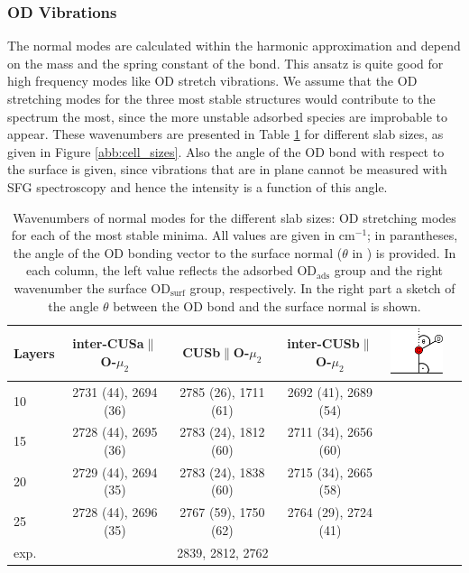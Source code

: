 \documentclass[11pt,DIV=13,BCOR=5mm,a4paper,headinclude]{scrbook}
\begin{document}
\subsubsection{OD Vibrations}
The normal modes are calculated within the harmonic approximation and depend on the mass and the spring constant of the bond.
This ansatz is quite good for high frequency modes like OD stretch vibrations.
We assume that the OD stretching modes for the three most stable structures would contribute to the spectrum the most, since the more unstable adsorbed species are improbable to appear.
These wavenumbers are presented in Table \ref{tab:freq_layers} for different slab sizes, as given in Figure \ref{abb:cell_sizes}.
Also the angle of the OD bond with respect to the surface is given, since vibrations that are in plane cannot be measured with SFG spectroscopy and hence the intensity is a function of this angle.
\begin{table}[th]
  \centering
 \caption{Wavenumbers of normal modes for the different slab sizes: OD stretching modes for each of the most stable minima.
All values are given in cm$^{-1}$; in parantheses, the angle of the OD bonding vector to the surface normal ($\theta$ in \textdegree) is provided.
In each column, the left value reflects the adsorbed OD$_\textrm{ads}$ group and the right wavenumber the surface OD$_\textrm{surf}$ group, respectively.
 In the right part a sketch of the angle $\theta$ between the OD bond and the surface normal is shown.}
\vspace*{.2cm} 
 \begin{tabular}{l|ccccc}
 \toprule
  Layers&inter-CUSa$\parallel$O-$\mu_2$ &CUSb$\parallel$O-$\mu_2$  &inter-CUSb$\parallel$O-$\mu_2$&\multirow{6}{1pt}{\includegraphics[width=2cm]{figures/11-20/ODangle.png}} \\\midrule
  10 &2731 (44), 2694 (36) &2785 (26), 1711 (61) &2692 (41), 2689 (54)& \\
  15 &2728 (44), 2695 (36) &2783 (24), 1812 (60) &2711 (34), 2656 (60)& \\
  20 &2729 (44), 2694 (35) &2783 (24), 1838 (60) &2715 (34), 2665 (58)& \\
  25 &2728 (44), 2696 (35) &2767 (59), 1750 (62) &2764 (29), 2724 (41)& \\\midrule
  exp. & \multicolumn{3}{c}{2839, 2812, 2762}& \\\bottomrule
  \end{tabular} 
  \label{tab:freq_layers}
\end{table}
\end{document}
